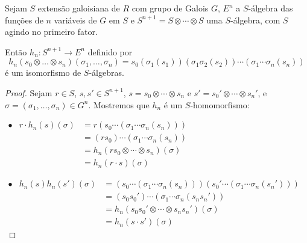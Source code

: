 \begin{lemma}
Sejam $S$ extensão galoisiana de $R$ com grupo de Galois $G$, $E^n$ a $S$-álgebra das funções de $n$ variáveis de $G$ em $S$ e $S^{n+1} = S\otimes \cdots \otimes S$ uma $S$-álgebra, com $S$ agindo no primeiro fator. \par
Então $h_n: S^{n+1}\rightarrow E^n$ definido por
\[h_n(s_0 \otimes \dots \otimes s_n)(\sigma_1,\dots,\sigma_n) = s_0\left( \sigma_1(s_1)\right)\left( \sigma_1\sigma_2(s_2)\right) \cdots \left(\sigma_1\cdots\sigma_n(s_n)\right)\] é um isomorfismo de $S$-álgebras.
\begin{proof}
Sejam $r \in S$, $s, s' \in S^{n+1}$, $s =s_0 \otimes \cdots \otimes s_n$ e $s'=s_0' \otimes \cdots \otimes s_n'$, e $\sigma = (\sigma_1, \dots, \sigma_n) \in G^n$. Mostremos que $h_n$ é um $S$-homomorfismo: 

\vspace{0.3cm}
$\begin{array}{rrl}
    \bullet & r\cdot h_n(s)(\sigma) &= r \left(s_0\cdots \left(\sigma_1\cdots\sigma_n (s_n)\right) \right)\\
    & &= \left(rs_0\right)\cdots\left(\sigma_1\cdots\sigma_n(s_n)\right) \\
    & &= h_n(rs_0\otimes\cdots\otimes s_n)(\sigma) \\
    & &= h_n(r \cdot s)(\sigma)
\end{array}$

\vspace{0.3cm}
$\begin{array}{rrl}
    \bullet & h_n(s)h_n(s')(\sigma) &= \left(s_0\cdots\left(\sigma_1\cdots\sigma_n(s_n)\right)\right)\left(s_0'\cdots\left(\sigma_1\cdots\sigma_n(s_n')\right)\right) \\
    & &= \left(s_0s_0'\right)\cdots\left( \sigma_1\cdots\sigma_n (s_n s_n')\right) \\
    & &=h_n(s_0s_0' \otimes\cdots\otimes s_ns_n')(\sigma) \\
    & &= h_n(s\cdot s')(\sigma)
\end{array}$
\vspace{0.3cm}


\end{proof}
\end{lemma}
